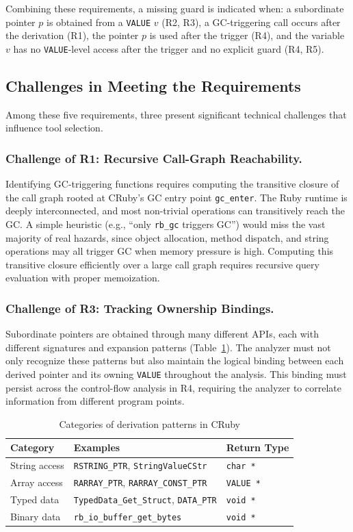 Combining these requirements, a missing guard is indicated when: a subordinate pointer $p$ is obtained from a \texttt{VALUE} $v$ (R2, R3), a GC-triggering call occurs after the derivation (R1), the pointer $p$ is used after the trigger (R4), and the variable $v$ has no \texttt{VALUE}-level access after the trigger and no explicit guard (R4, R5).

\subsection{Challenges in Meeting the Requirements}

Among these five requirements, three present significant technical challenges that influence tool selection.

\subsubsection*{Challenge of R1: Recursive Call-Graph Reachability.}
Identifying GC-triggering functions requires computing the transitive closure of the call graph rooted at CRuby's GC entry point \texttt{gc\_enter}. The Ruby runtime is deeply interconnected, and most non-trivial operations can transitively reach the GC. A simple heuristic (e.g., ``only \texttt{rb\_gc} triggers GC'') would miss the vast majority of real hazards, since object allocation, method dispatch, and string operations may all trigger GC when memory pressure is high. Computing this transitive closure efficiently over a large call graph requires recursive query evaluation with proper memoization.

\subsubsection*{Challenge of R3: Tracking Ownership Bindings.}
Subordinate pointers are obtained through many different APIs, each with different signatures and expansion patterns (Table~\ref{tab:derivation_patterns}). The analyzer must not only recognize these patterns but also maintain the logical binding between each derived pointer and its owning \texttt{VALUE} throughout the analysis. This binding must persist across the control-flow analysis in R4, requiring the analyzer to correlate information from different program points.

\begin{table}[ht]
\centering
\caption{Categories of derivation patterns in CRuby}
\label{tab:derivation_patterns}
\begin{tabular}{lll}
\toprule
\textbf{Category} & \textbf{Examples} & \textbf{Return Type} \\
\midrule
String access & \texttt{RSTRING\_PTR}, \texttt{StringValueCStr} & \texttt{char *} \\
Array access & \texttt{RARRAY\_PTR}, \texttt{RARRAY\_CONST\_PTR} & \texttt{VALUE *} \\
Typed data & \texttt{TypedData\_Get\_Struct}, \texttt{DATA\_PTR} & \texttt{void *} \\
Binary data & \texttt{rb\_io\_buffer\_get\_bytes} & \texttt{void *} \\
\bottomrule
\end{tabular}
\end{table}

